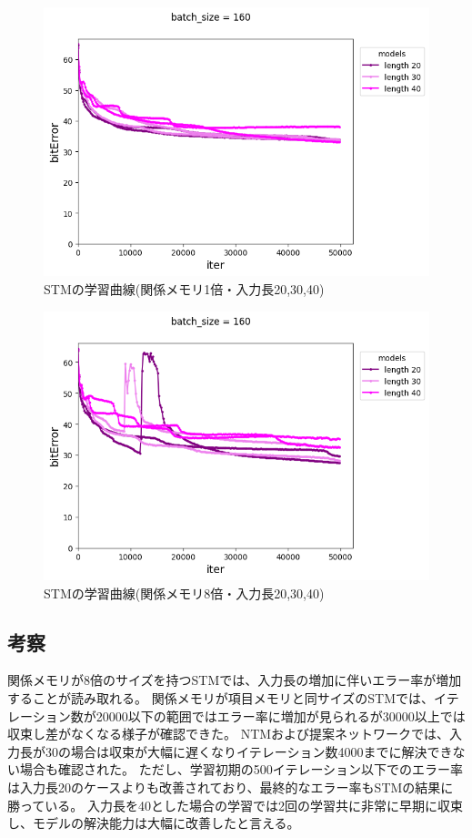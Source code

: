 \begin{figure}[t]
	\centering
	\includegraphics[width=\linewidth]{./figure/priority/sam_x1_l20,30,40.png}
	\caption{STMの学習曲線(関係メモリ1倍・入力長20,30,40)}
	\label{fig:priority_sam_x1_l20,30,40}
\end{figure}
\begin{figure}[t]
	\centering
	\includegraphics[width=\linewidth]{./figure/priority/sam_x8_l20,30,40.png}
	\caption{STMの学習曲線(関係メモリ8倍・入力長20,30,40)}
	\label{fig:priority_sam_x8_l20,30,40}
\end{figure}

\subsection{考察}
関係メモリが8倍のサイズを持つSTMでは、入力長の増加に伴いエラー率が増加することが読み取れる。
関係メモリが項目メモリと同サイズのSTMでは、イテレーション数が20000以下の範囲ではエラー率に増加が見られるが30000以上では収束し差がなくなる様子が確認できた。
NTMおよび提案ネットワークでは、入力長が30の場合は収束が大幅に遅くなりイテレーション数4000までに解決できない場合も確認された。
ただし、学習初期の500イテレーション以下でのエラー率は入力長20のケースよりも改善されており、最終的なエラー率もSTMの結果に勝っている。
入力長を40とした場合の学習では2回の学習共に非常に早期に収束し、モデルの解決能力は大幅に改善したと言える。

